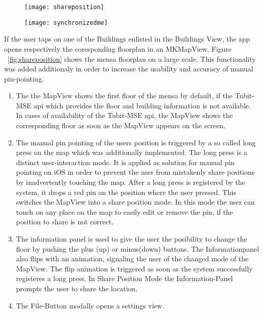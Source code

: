\begin{figure}
\centering
\begin{minipage}{.5\textwidth}
  \centering
  \texttt{[image: shareposition]}
  \label{fig:shareposition}
\end{minipage}%
\begin{minipage}{.5\textwidth}
  \centering
  \texttt{[image: synchronizedme]}
  \label{fig:synchronizedme}
\end{minipage}
\end{figure}


If the user taps on one of the Buildings enlisted in the Buildings View, the app opens respectively
the coresponding floorplan in an MKMapView. Figure ~\ref{fig:shareposition} shows the mensa floorplan on a large scale. This functionality was added additionaly in order to increase the usability and accuracy of manual pin-pointing.

\begin{enumerate}
\item The the MapView shows the first floor of the mensa by default, if the Tubit-MSE api which provides the floor and building information is not available. In cases of availability of the Tubit-MSE api, the MapView shows the corresponding floor as soon as the MapView appears on the screen.

\item The manual pin pointing of the users position is triggered by a so called long press on the map which was additionally implemented. The long press is a distinct user-interaction mode. It is applied as solution for manual pin pointing on iOS in order to prevent the user from mistakenly share  positions by inadvertently touching the map. After a long press is registered by the system, it drops a red pin on the position where the user pressed. This switches the MapView into a share position mode. In this mode the user can touch on any place on the map to easily edit or remove the pin, if the position to share is not correct.

\item The information panel is used to give the user the posibility to change the floor by pushing the plus (up) or minus(down) buttons. The Informationpanel also flips with an animation, signaling the user of the changed mode of the MapView. The flip animation is triggered as soon as the system successfully registeres a long press. In Share Position Mode the Information-Panel prompts the user to share the location.

\item The File-Button modally opens a settings view.
\end{enumerate}


